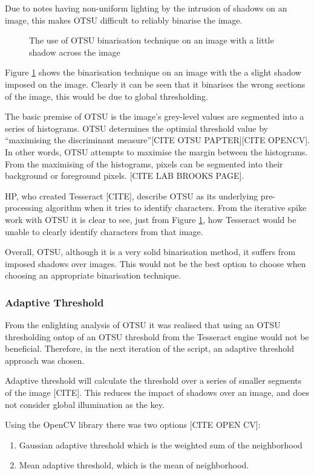 Due to notes having non-uniform lighting by the intrusion of shadows on an image, this makes OTSU difficult to reliably binarise the image.

\begin{figure}[H]
  \centering
  \label{fig:OTSU}
  \caption{The use of OTSU binarisation technique on an image with a little shadow across the image}
\end{figure}

Figure \ref{fig:OTSU} shows the binarisation technique on an image with the a slight shadow imposed on the image. Clearly it can be seen that it binarises the wrong sections of the image, this would be due to global thresholding.

The basic premise of OTSU is the image's grey-level values are segmented into a series of histograms. OTSU determines the optimial threshold value by ``maximising the discriminant measure''[CITE OTSU PAPTER][CITE OPENCV]. In other words, OTSU attempts to maximise the margin between the histograms. From the maximising of the histograms, pixels can be segmented into their background or foreground pixels. [CITE LAB BROOKS PAGE].

HP, who created Tesseract [CITE], describe OTSU as its underlying pre-processing algorithm when it tries to identify characters. From the iterative spike work with OTSU it is clear to see, just from Figure \ref{fig:OTSU}, how Tesseract would be unable to clearly identify characters from that image.

Overall, OTSU, although it is a very solid binarisation method, it suffers from imposed shadows over images. This would not be the best option to choose when choosing an appropriate binarisation technique.

\subsubsection{Adaptive Threshold}
From the enlighting analysis of OTSU it was realised that using an OTSU thresholding ontop of an OTSU threshold from the Tesseract engine would not be beneficial. Therefore, in the next iteration of the script, an adaptive threshold approach was chosen.

Adaptive threshold will calculate the threshold over a series of smaller segments of the image [CITE]. This reduces the impact of shadows over an image, and does not consider global illumination as the key.

Using the OpenCV library there was two options [CITE OPEN CV]:
\begin{enumerate}
  \item Gaussian adaptive threshold which is the weighted sum of the neighborhood
  \item Mean adaptive threshold, which is the mean of neighborhood.
\end{enumerate}


